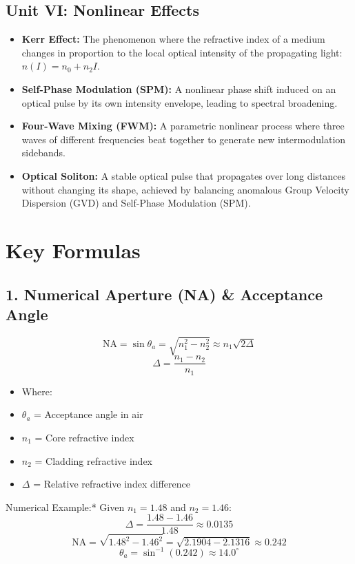 \subsection{Unit VI: Nonlinear Effects}
\begin{itemize}
  \item   \textbf{Kerr Effect:} The phenomenon where the refractive index of a medium changes in proportion to the local optical intensity of the propagating light: $n(I) = n_0 + n_2 I$.
  \item   \textbf{Self-Phase Modulation (SPM):} A nonlinear phase shift induced on an optical pulse by its own intensity envelope, leading to spectral broadening.
  \item   \textbf{Four-Wave Mixing (FWM):} A parametric nonlinear process where three waves of different frequencies beat together to generate new intermodulation sidebands.
  \item   \textbf{Optical Soliton:} A stable optical pulse that propagates over long distances without changing its shape, achieved by balancing anomalous Group Velocity Dispersion (GVD) and Self-Phase Modulation (SPM).
\end{itemize}


\section{Key Formulas}

\subsection{1. Numerical Aperture (NA) \& Acceptance Angle}
\[ \text{NA} = \sin \theta_a = \sqrt{n_1^2 - n_2^2} \approx n_1 \sqrt{2\Delta} \]
\[ \Delta = \frac{n_1 - n_2}{n_1} \]
\begin{itemize}
  \item   Where:
  \item   $\theta_a$ = Acceptance angle in air
  \item   $n_1$ = Core refractive index
  \item   $n_2$ = Cladding refractive index
  \item   $\Delta$ = Relative refractive index difference
\end{itemize}
\textit{   }Numerical Example:* Given $n_1 = 1.48$ and $n_2 = 1.46$:
    \[ \Delta = \frac{1.48 - 1.46}{1.48} \approx 0.0135 \]
    \[ \text{NA} = \sqrt{1.48^2 - 1.46^2} = \sqrt{2.1904 - 2.1316} \approx \mathbf{0.242} \]
    \[ \theta_a = \sin^{-1}(0.242) \approx \mathbf{14.0^\circ} \]

